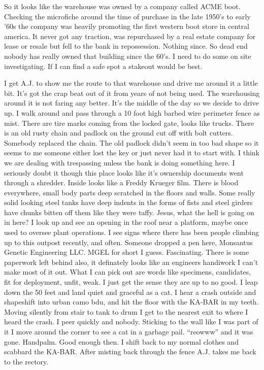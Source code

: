 So it looks like the warehouse was owned by a company called ACME boot. Checking the microfiche around the time of purchase in the late 1950's to early '60s the company was heavily promoting the first western boot store in central america. It never got any traction, was repurchased by a real estate company for lease or resale but fell to the bank in repossession. Nothing since. So dead end nobody has really owned that building since the 60's. I need to do some on site investigating. If I can find a safe spot a stakeout would be best.

I get A.J. to show me the route to that warehouse and drive me around it a little bit. It's got the crap beat out of it from years of not being used. The warehousing around it is not faring any better. It's the middle of the day so we decide to drive up. I walk around and pass through a 10 foot high barbed wire perimeter fence as mist. There are tire marks coming from the locked gate, looks like trucks. There is an old rusty chain and padlock on the ground cut off with bolt cutters. Somebody replaced the chain. The old padlock didn't seem in too bad shape so it seems to me someone either lost the key or just never had it to start with. I think we are dealing with trespassing unless the bank is doing something here. I seriously doubt it though this place looks like it's ownership documents went through a shredder. Inside looks like a Freddy Krueger film. There is blood everywhere, small body parts deep scratched in the floors and walls. Some really solid looking steel tanks have deep indents in the forms of fists and steel girders have chunks bitten off them like they were taffy. Jesus, what the hell is going on in here? I look up and see an opening in the roof near a platform, maybe once used to oversee plant operations. I see signs where there has been people climbing up to this outpost recently, and often. Someone dropped a pen here, Monsantus Genetic Engineering LLC. MGEL for short I guess. Fascinating. There is some paperwork left behind also, it definately looks like an engineers handiwork I can't make most of it out. What I can pick out are words like specimens, candidates, fit for deployment, unfit, weak. I just get the sense they are up to no good. I leap down the 50 feet and land quiet and graceful as a cat. I hear a crash outside and shapeshift into urban camo bdu, and hit the floor with the KA-BAR in my teeth. Moving silently from stair to tank to drum I get to the nearest exit to where I heard the crash. I peer quickly and nobody. Sticking to the wall like I was part of it I move around the corner to see a cat in a garbage pail. ``reowww'' and it was gone. Handpalm. Good enough then. I shift back to my normal clothes and scabbard the KA-BAR. After misting back through the fence A.J. takes me back to the rectory.


